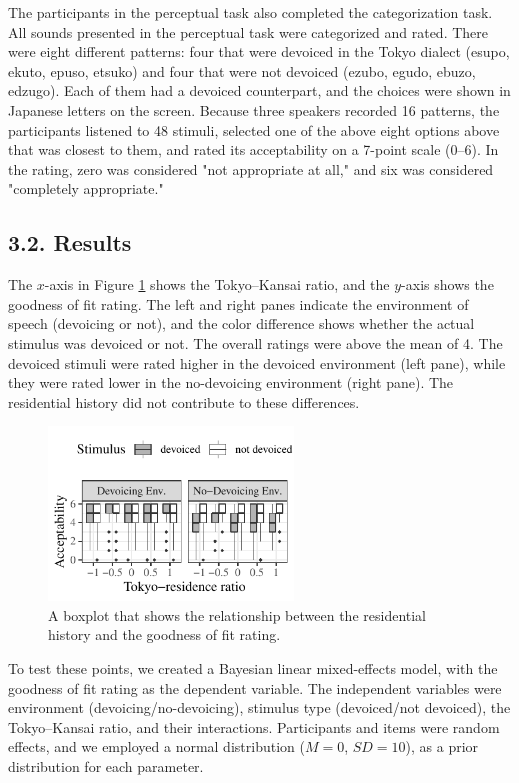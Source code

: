 \documentclass[a4paper,11pt,twocolumn]{article}
\begin{document}
The participants in the perceptual task also completed the categorization task. All sounds presented in the perceptual task were categorized and rated. There were eight different patterns: four that were devoiced in the Tokyo dialect (esupo, ekuto, epuso, etsuko) and four that were not devoiced (ezubo, egudo, ebuzo, edzugo). Each of them had a devoiced counterpart, and the choices were shown in Japanese letters on the screen. Because three speakers recorded 16 patterns, the participants listened to 48 stimuli, selected one of the above eight options above that was closest to them, and rated its acceptability on a 7-point scale (0--6). In the rating, zero was considered "not appropriate at all," and six was considered "completely appropriate."

\subsection{3.2. Results}

The $x$-axis in Figure \ref{fig:cat_results} shows the Tokyo--Kansai ratio, and the $y$-axis shows the goodness of fit rating. The left and right panes indicate the environment of speech (devoicing or not), and the color difference shows whether the actual stimulus was devoiced or not. The overall ratings were above the mean of 4. The devoiced stimuli were rated higher in the devoiced environment (left pane), while they were rated lower in the no-devoicing environment (right pane). The residential history did not contribute to these differences.
\begin{figure}[!ht]
\begin{center}
\includegraphics[width=6.5cm]{../results/artifact/results_categorization.pdf}
\caption{A boxplot that shows the relationship between the residential history and the goodness of fit rating.}\label{fig:cat_results}
\end{center}
\end{figure}

To test these points, we created a Bayesian linear mixed-effects model, with the goodness of fit rating as the dependent variable. The independent variables were environment (devoicing/no-devoicing), stimulus type (devoiced/not devoiced), the Tokyo--Kansai ratio, and their interactions. Participants and items were random effects, and we employed a normal distribution ($M=0$, $SD=10$), as a prior distribution for each parameter.
\end{document}
